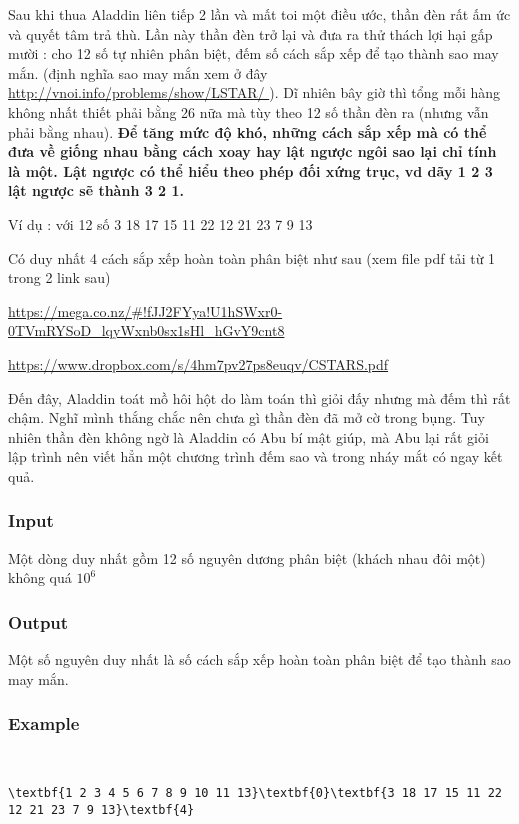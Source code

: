 

Sau khi thua Aladdin liên tiếp 2 lần và mất toi một điều ước, thần đèn rất ấm ức và quyết tâm trả thù. Lần này thần đèn trở lại và đưa ra thử thách lợi hại gấp mười : cho 12 số tự nhiên phân biệt, đếm số cách sắp xếp để tạo thành sao may mắn. (định nghĩa sao may mắn xem ở đây \href{http://vnoi.info/problems/show/LSTAR/}{ http://vnoi.info/problems/show/LSTAR/ } ). Dĩ nhiên bây giờ thì tổng mỗi hàng không nhất thiết phải bằng 26 nữa mà tùy theo 12 số thần đèn ra (nhưng vẫn phải bằng nhau). \textbf{ Để tăng mức độ khó, những cách sắp xếp mà có thể đưa về giống nhau bằng cách xoay hay lật ngược ngôi sao lại chỉ tính là một. Lật ngược có thể hiểu theo phép đối xứng trục, vd dãy 1 2 3 lật ngược sẽ thành 3 2 1. }

Ví dụ : với 12 số 3 18 17 15 11 22 12 21 23 7 9 13

Có duy nhất 4 cách sắp xếp hoàn toàn phân biệt như sau (xem file pdf tải từ 1 trong 2 link sau)

\href{https://mega.co.nz/#!fJJ2FYya!U1hSWxr0-0TVmRYSoD_lqyWxnb0sx1sHl_hGvY9cnt8}{https://mega.co.nz/\#!fJJ2FYya!U1hSWxr0-0TVmRYSoD\_lqyWxnb0sx1sHl\_hGvY9cnt8 }

\href{https://www.dropbox.com/s/4hm7pv27ps8euqv/CSTARS.pdf}{https://www.dropbox.com/s/4hm7pv27ps8euqv/CSTARS.pdf }

Đến đây, Aladdin toát mồ hôi hột do làm toán thì giỏi đấy nhưng mà đếm thì rất chậm. Nghĩ mình thắng chắc nên chưa gì thần đèn đã mở cờ trong bụng. Tuy nhiên thần đèn không ngờ là Aladdin có Abu bí mật giúp, mà Abu lại rất giỏi lập trình nên viết hẳn một chương trình đếm sao và trong nháy mắt có ngay kết quả.

\subsubsection{Input}

Một dòng duy nhất gồm 12 số nguyên dương phân biệt (khách nhau đôi một) không quá $10^{6}$

\subsubsection{Output}

Một số nguyên duy nhất là số cách sắp xếp hoàn toàn phân biệt để tạo thành sao may mắn.

\subsubsection{Example}

 
\begin{verbatim}
\textbf{1 2 3 4 5 6 7 8 9 10 11 13}\textbf{0}\textbf{3 18 17 15 11 22 12 21 23 7 9 13}\textbf{4}\end{verbatim}
